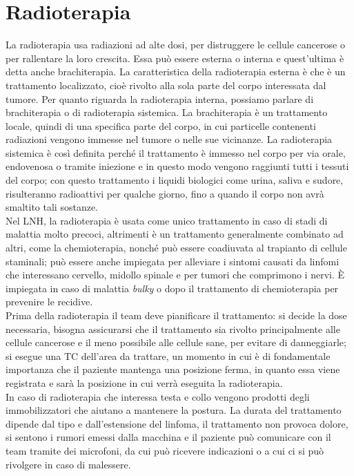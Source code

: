 \section{Radioterapia}
La radioterapia usa radiazioni ad alte dosi, per distruggere le cellule cancerose o per rallentare la loro crescita. 
Essa può essere esterna o interna e quest'ultima è detta anche brachiterapia. 
La caratteristica della radioterapia esterna è che è un trattamento localizzato, cioè rivolto alla sola parte 
del corpo interessata dal tumore. 
Per quanto riguarda la radioterapia interna, possiamo parlare di brachiterapia o di radioterapia sistemica. 
La brachiterapia è un trattamento locale, quindi di una specifica parte del corpo, in cui particelle contenenti 
radiazioni vengono immesse nel tumore o nelle sue vicinanze. 
La radioterapia sistemica è così definita perché il trattamento è immesso nel corpo per via orale, endovenosa o 
tramite iniezione e in questo modo vengono raggiunti tutti i tessuti del corpo; con questo trattamento i liquidi biologici 
come urina, saliva e sudore, risulteranno radioattivi per qualche giorno, fino a quando il corpo non avrà smaltito 
tali sostanze\cite{NIH}.\\
Nel LNH, la radioterapia è usata come unico trattamento in caso di stadi di malattia molto precoci, 
altrimenti è un trattamento generalmente combinato ad altri, come la chemioterapia, nonché può essere 
coadiuvata al trapianto di cellule staminali; può essere anche impiegata per alleviare i sintomi causati da 
linfomi che interessano cervello, midollo spinale e per tumori che comprimono i nervi\cite{ACSRADIATION}.
È impiegata in caso di malattia \emph{bulky} o dopo il trattamento di chemioterapia per prevenire le recidive.\\

Prima della radioterapia il team deve pianificare il trattamento: si decide la dose necessaria, bisogna assicurarsi 
che il trattamento sia rivolto principalmente alle cellule cancerose e il meno possibile alle cellule sane, 
per evitare di danneggiarle; si esegue una TC dell’area da trattare, un momento in cui è di fondamentale importanza 
che il paziente mantenga una posizione ferma, in quanto essa viene registrata e sarà la posizione in cui verrà eseguita la 
radioterapia\cite{MACMILLAN}.\\
In caso di radioterapia che interessa testa e collo vengono prodotti degli immobilizzatori che aiutano a mantenere 
la postura. La durata del trattamento dipende dal tipo e dall’estensione del linfoma, il trattamento non provoca 
dolore, si sentono i rumori emessi dalla macchina e il paziente può comunicare con il team tramite dei microfoni, da cui 
può ricevere indicazioni o a cui ci si può rivolgere in caso di malessere\cite{UKRADIOTP}.

